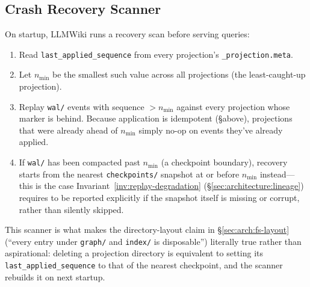 \subsection{Crash Recovery Scanner}
On startup, LLMWiki runs a recovery scan before serving queries:
\begin{enumerate}
  \item Read \texttt{last\_applied\_sequence} from every projection's \texttt{\_projection.meta}.
  \item Let $n_{\min}$ be the smallest such value across all projections (the least-caught-up projection).
  \item Replay \texttt{wal/} events with sequence $> n_{\min}$ against every projection whose marker is behind. Because application is idempotent (\S above), projections that were already ahead of $n_{\min}$ simply no-op on events they've already applied.
  \item If \texttt{wal/} has been compacted past $n_{\min}$ (a checkpoint boundary), recovery starts from the nearest \texttt{checkpoints/} snapshot at or before $n_{\min}$ instead---this is the case Invariant~\ref{inv:replay-degradation} (\S\ref{sec:architecture:lineage}) requires to be reported explicitly if the snapshot itself is missing or corrupt, rather than silently skipped.
\end{enumerate}
This scanner is what makes the directory-layout claim in \S\ref{sec:arch:fs-layout} (``every entry under \texttt{graph/} and \texttt{index/} is disposable'') literally true rather than aspirational: deleting a projection directory is equivalent to setting its \texttt{last\_applied\_sequence} to that of the nearest checkpoint, and the scanner rebuilds it on next startup.

